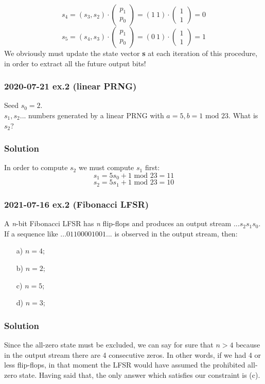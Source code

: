\documentclass[11pt, a4paper]{article}
\newcommand{\mymod}{
    \text{ mod }
}
\begin{document}
$$
    s_4=(s_3, s_2)\cdot
    \begin{pmatrix}
        p_1\\
        p_0
    \end{pmatrix}=
    (1\ 1)\cdot
    \begin{pmatrix}
        1\\
        1
    \end{pmatrix}=0
$$
$$
    s_5=(s_4, s_3)\cdot
    \begin{pmatrix}
        p_1\\
        p_0
    \end{pmatrix}=
    (0\ 1)\cdot
    \begin{pmatrix}
        1\\
        1
    \end{pmatrix}=1
$$
We obviously must update the state vector \textbf{s} at each iteration of this procedure, in order to extract all the future output bits!
\newpage
\subsubsection{2020-07-21 ex.2 (linear PRNG)}
Seed $s_0=2$.\\
$s_1,s_2$... numbers generated  by a linear PRNG with $a=5, b=1\mymod 23$. What is $s_2$?
\subsubsection*{Solution}
In order to compute $s_2$ we must compute $s_1$ first:
$$s_1=5s_0+1\mymod 23=11$$
$$s_2=5s_1+1\mymod 23=10$$

\subsubsection{2021-07-16 ex.2 (Fibonacci LFSR)}
A \textit{n}-bit Fibonacci LFSR has \textit{n} flip-flops and produces an output stream $...s_2s_1s_0$.\\
If a sequence like $...01100001001...$ is observed in the output stream, then:
\begin{enumerate}
    \item[a)] $n=4$;
    \item[b)] $n=2$;
    \item[c)] $n=5$;
    \item[d)] $n=3$;
\end{enumerate}

\subsubsection*{Solution}
Since the all-zero state must be excluded, we can say for sure that $n>4$ because in the output stream there are 4 consecutive zeros. In other words, if we had 4 or less flip-flops, in that moment the LFSR would have assumed the prohibited all-zero state. Having said that, the only answer which satisfies our constraint is \nolinebreak(c).
\end{document}
